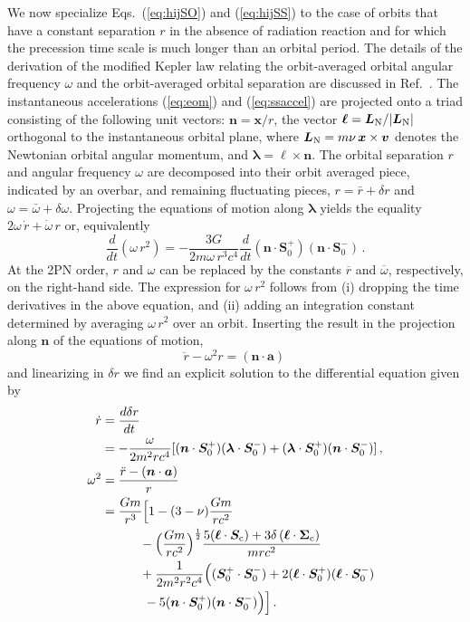 \documentclass[aps, prd,
twocolumn,%
superscriptaddress,
showpacs, nofootinbib, eqsecnum, amsmath, amssymb, floatfix
]{revtex4}
\newcommand{\bmSeffp}{{\bm{S}_{0}^+}}
\newcommand{\bmSeffm}{{\bm{S}_{0}^-}}
\begin{document}
We now specialize Eqs.~(\ref{eq:hijSO}) and (\ref{eq:hijSS}) to the
case of orbits that have a constant separation $r$ in the absence of
radiation reaction and for which the precession time scale is much
longer than an orbital period.  The details of the derivation of the
modified Kepler law relating the orbit-averaged orbital angular
frequency $\omega$ and the orbit-averaged orbital separation are
discussed in Ref.~\cite{Racine2008}. The instantaneous accelerations
(\ref{eq:eom}) and (\ref{eq:ssaccel}) are projected onto a triad
consisting of the following unit vectors: $\bm{n}=\bm{x}/r$, the
vector $\bm{\ell}=\bm{L}_{\rm N}/|\bm{L}_{\rm N}|$ orthogonal to the
instantaneous orbital plane, where $\bm{L}_{\rm N}=m\nu\,
\bm{x}\times \bm{v}$ denotes the Newtonian orbital angular momentum,
and $\bm{\lambda}=\bm{\ell}\times \bm{n}$. The orbital separation
$r$ and angular frequency $\omega$ are decomposed into their orbit
averaged piece, indicated by an overbar, and remaining fluctuating
pieces, $r=\bar r+\delta r$ and $\omega=\bar \omega+\delta \omega$.
Projecting the equations of motion along $\bm{\lambda}$ yields the
equality $2 \omega \, \dot{r} + \dot{\omega}\, r$ or,
equivalently~\cite{Racine2008}
%
\begin{equation}
\frac{d}{dt} (\omega\, r^2) = - \frac{3G}{2 m \omega\,r^3c^4} \frac{d}{dt}
(\bm{n} \cdot \bmSeffp) (\bm{n} \cdot \bmSeffm) \, .
\end{equation}
%
At the 2PN order, $r$ and $\omega$ can be replaced by the constants
$\overline{r}$ and $\overline{\omega}$, respectively, on the right-hand side.
The expression for $\omega\, r^2$ follows from (i) dropping the time
derivatives in the above equation, and (ii) adding an integration constant
determined by averaging $\omega\, r^2$ over an orbit. Inserting the result in
the projection along $\bm{n}$ of the equations of motion,
%
\begin{equation}
\ddot{r} - \omega^2 r =  (\bm{n}\cdot \bm{a}) \,
\end{equation}
%
and linearizing in $\delta r$ we find an explicit solution to the differential
equation given by
%
\begin{subequations}
\begin{align}
\label{eq:rdot}
\dot{r} &= \frac{d\delta r}{dt} \nonumber \\ &
= - \frac{\omega}{2 m^2 r c^4}
[(\bm{n} \cdot \bmSeffp) (\bm{\lambda} \cdot \bmSeffm) +
(\bm{\lambda}\cdot \bmSeffp) (\bm{n}\cdot \bmSeffm)]  \, ,\\
\omega^2 &= \frac{\ddot{r}-(\bm{n} \cdot \bm{a})}{r} \nonumber \\*
&  = \frac{G m}{r^3} \Big[1 - (3-\nu) \frac{G m}{rc^2} \nonumber \\*
& \qquad  \quad- \Big(\frac{G m}{r c^2}\Big)^\frac{1}{2}
\frac{5 (\bm{\ell}\cdot \bm{S}_{\rm c})+ 3 \delta\, (\bm{\ell}\cdot
  \bm{\Sigma}_{\rm c})}{mrc^2}
\nonumber \\* & \qquad \quad + \frac{1}{2m^2 r^2c^4} \Big((\bmSeffp
\cdot
\bmSeffm) +  2 (\bm{\ell}\cdot \bmSeffp) (\bm{\ell}\cdot
\bmSeffm)\nonumber \\*
& \qquad \quad ~-5 (\bm{n}\cdot\bmSeffp)
(\bm{n}\cdot \bmSeffm)\Big) \Big] \, .  \label{eq:omegaofr}
\end{align}
\end{subequations}
\end{document}
